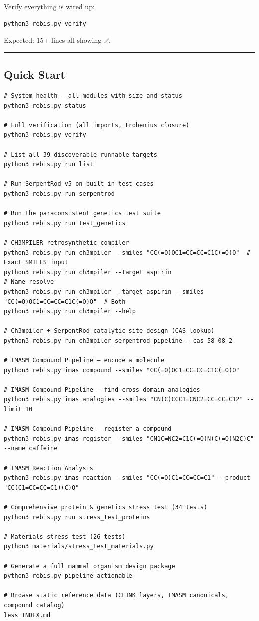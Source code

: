 \documentclass[12pt,a4paper]{article}
\begin{document}
Verify everything is wired up:

\begin{verbatim}
python3 rebis.py verify
\end{verbatim}

Expected: 15+ lines all showing \texttt{✅}.

\begin{center}\rule{0.5\linewidth}{0.5pt}\end{center}

\hypertarget{quick-start}{%
\subsection{Quick Start}\label{quick-start}}

\begin{verbatim}
# System health — all modules with size and status
python3 rebis.py status

# Full verification (all imports, Frobenius closure)
python3 rebis.py verify

# List all 39 discoverable runnable targets
python3 rebis.py run list

# Run SerpentRod v5 on built-in test cases
python3 rebis.py run serpentrod

# Run the paraconsistent genetics test suite
python3 rebis.py run test_genetics

# CH3MPILER retrosynthetic compiler
python3 rebis.py run ch3mpiler --smiles "CC(=O)OC1=CC=CC=C1C(=O)O"  # Exact SMILES input
python3 rebis.py run ch3mpiler --target aspirin                                   # Name resolve
python3 rebis.py run ch3mpiler --target aspirin --smiles "CC(=O)OC1=CC=CC=C1C(=O)O"  # Both
python3 rebis.py run ch3mpiler --help

# Ch3mpiler + SerpentRod catalytic site design (CAS lookup)
python3 rebis.py run ch3mpiler_serpentrod_pipeline --cas 58-08-2

# IMASM Compound Pipeline — encode a molecule
python3 rebis.py imas compound --smiles "CC(=O)OC1=CC=CC=C1C(=O)O"

# IMASM Compound Pipeline — find cross-domain analogies
python3 rebis.py imas analogies --smiles "CN(C)CCC1=CNC2=CC=CC=C12" --limit 10

# IMASM Compound Pipeline — register a compound
python3 rebis.py imas register --smiles "CN1C=NC2=C1C(=O)N(C(=O)N2C)C" --name caffeine

# IMASM Reaction Analysis
python3 rebis.py imas reaction --smiles "CC(=O)C1=CC=CC=C1" --product "CC(C1=CC=CC=C1)(C)O"

# Comprehensive protein & genetics stress test (34 tests)
python3 rebis.py run stress_test_proteins

# Materials stress test (26 tests)
python3 materials/stress_test_materials.py

# Generate a full mammal organism design package
python3 rebis.py pipeline actionable

# Browse static reference data (CLINK layers, IMASM canonicals, compound catalog)
less INDEX.md
\end{verbatim}
\end{document}
